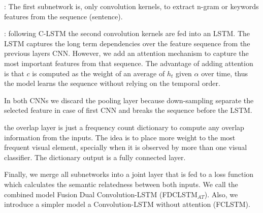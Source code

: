 \documentclass[phd,tocprelim]{cornell}
\begin{document}

: The first subnetwork is, only convolution kernels, to extract n-gram or keywords features from the sequence (sentence). 

: following C-LSTM \cite{zhou2015c} the second convolution kernels are fed into an LSTM. The LSTM captures the long term dependencies over the feature sequence from the previous layers CNN. However, we add an attention mechanism to capture the most important features from that sequence. The advantage of adding attention is that $c$ is computed as the weight of an average of $h_{t}$ given $\alpha$ over time, thus the model learns the sequence without relying on the temporal order.

In both CNNs we discard the pooling layer because down-sampling separate the selected feature in case of first CNN and breaks the sequence before the LSTM.



 the overlap layer is just a frequency count dictionary to compute any overlap information from the inputs. The idea is to place more weight to the most frequent visual element, specially when it is observed by more than one visual classifier. The dictionary output is a fully connected layer.  

Finally, we merge all subnetworks into a joint layer that is fed to a loss function which calculates the semantic relatedness between both inputs. We call the combined model Fusion Dual Convolution-LSTM (FDCLSTM$_{AT}$). Also, we introduce a simpler model a Convolution-LSTM without attention (FCLSTM).     
\medskip
 
\end{document}
